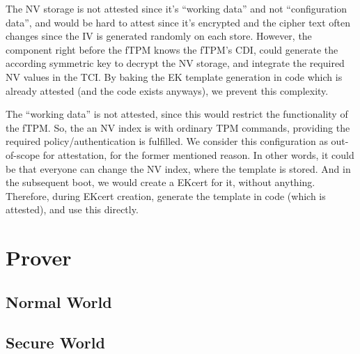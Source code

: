 The NV storage is not attested since it's ``working data'' and not ``configuration data'', and would be hard to attest since it's encrypted and the cipher text often changes since the IV is generated randomly on each store.
However, the component right before the fTPM knows the fTPM's CDI, could generate the according symmetric key to decrypt the NV storage, and integrate the required NV values in the TCI\@.
By baking the EK template generation in code which is already attested (and the code exists anyways), we prevent this complexity.

The ``working data'' is not attested, since this would restrict the functionality of the fTPM\@.
So, the an NV index is with ordinary TPM commands, providing the required policy/authentication is fulfilled.
We consider this configuration as out-of-scope for attestation, for the former mentioned reason.
In other words, it could be that everyone can change the NV index, where the template is stored.
And in the subsequent boot, we would create a EKcert for it, without anything.
Therefore, during EKcert creation, generate the template in code (which is attested), and use this directly.




\section{Prover}
\subsection{Normal World}

\subsection{Secure World}

